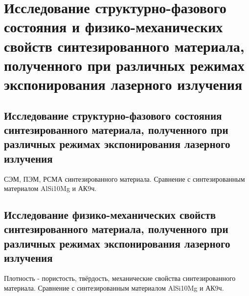 \chapter{Исследование структурно-фазового состояния и физико-механических свойств синтезированного материала, полученного при различных режимах экспонирования лазерного излучения}\label{ch:chapter5}

\section{Исследование структурно-фазового состояния синтезированного материала, полученного при различных режимах экспонирования лазерного излучения}\label{sec:chapter5/section1}

СЭМ, ПЭМ, РСМА синтезированного материала. Сравнение с синтезированным материалом AlSi10Mg и АК9ч.

\section{Исследование физико-механических свойств синтезированного материала, полученного при различных режимах экспонирования лазерного излучения}\label{sec:chapter5/section2}

Плотность - пористость, твёрдость, механические свойства синтезированного материала. Сравнение с синтезированным материалом AlSi10Mg и АК9ч.